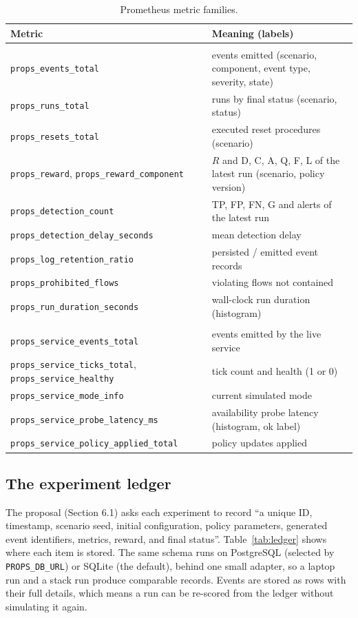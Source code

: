 \documentclass[11pt]{article}
\newcommand{\code}[1]{\texttt{\small #1}}
\begin{document}
\begin{table}[h]
\centering
\caption{Prometheus metric families.}
\label{tab:prom}
\footnotesize
\begin{tabular}{>{\RaggedRight\arraybackslash}p{6.5cm} >{\RaggedRight\arraybackslash}p{7.1cm}}
\toprule
\textbf{Metric} & \textbf{Meaning (labels)}\\
\midrule
\multicolumn{2}{l}{\emph{Experiment runner (Pushgateway / textfile)}}\\
\code{props\_events\_total} & events emitted (scenario, component, event type, severity, state)\\
\code{props\_runs\_total} & runs by final status (scenario, status)\\
\code{props\_resets\_total} & executed reset procedures (scenario)\\
\code{props\_reward}, \code{props\_reward\_component} & $R$ and D, C, A, Q, F, L of the latest run (scenario, policy version)\\
\code{props\_detection\_count} & TP, FP, FN, G and alerts of the latest run\\
\code{props\_detection\_delay\_seconds} & mean detection delay\\
\code{props\_log\_retention\_ratio} & persisted / emitted event records\\
\code{props\_prohibited\_flows} & violating flows not contained\\
\code{props\_run\_duration\_seconds} & wall-clock run duration (histogram)\\
\midrule
\multicolumn{2}{l}{\emph{Live services (scraped)}}\\
\code{props\_service\_events\_total} & events emitted by the live service\\
\code{props\_service\_ticks\_total}, \code{props\_service\_healthy} & tick count and health (1 or 0)\\
\code{props\_service\_mode\_info} & current simulated mode\\
\code{props\_service\_probe\_latency\_ms} & availability probe latency (histogram, ok label)\\
\code{props\_service\_policy\_applied\_total} & policy updates applied\\
\bottomrule
\end{tabular}
\end{table}

\subsection{The experiment ledger}
The proposal (Section 6.1) asks each experiment to record ``a unique ID,
timestamp, scenario seed, initial configuration, policy parameters, generated
event identifiers, metrics, reward, and final status''. Table~\ref{tab:ledger}
shows where each item is stored. The same schema runs on PostgreSQL (selected by
\code{PROPS\_DB\_URL}) or SQLite (the default), behind one small adapter, so a
laptop run and a stack run produce comparable records. Events are stored as rows
with their full details, which means a run can be re-scored from the ledger
without simulating it again.
\end{document}
